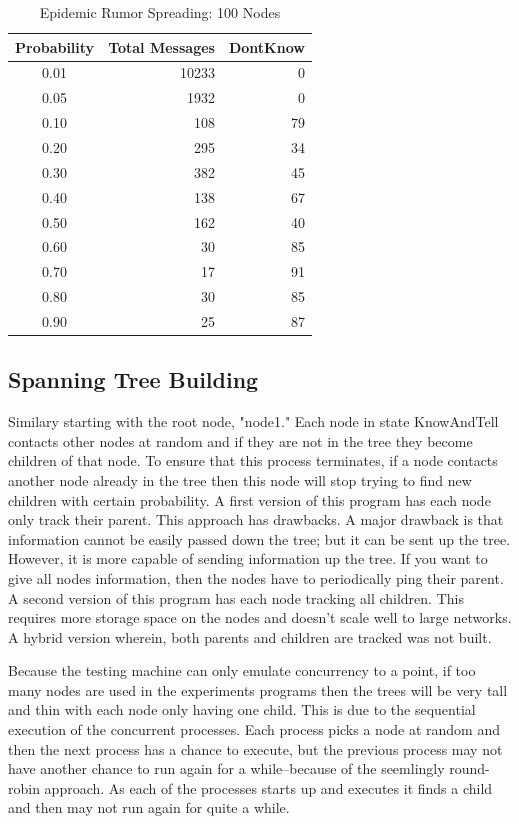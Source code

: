 \documentclass[11pt,twocolumn]{article}
\begin{document}
\begin{table}[h]
\caption{Epidemic Rumor Spreading: 100 Nodes}
\centering
\begin{tabular}{c | r r}
Probability & Total Messages & DontKnow\\
\hline
0.01	& 10233 & 0\\
0.05	& 1932 & 0\\
0.10 & 108 & 79\\
0.20 & 295 & 34\\
0.30 & 382 & 45\\
0.40 & 138 & 67\\
0.50 & 162 & 40\\
0.60 & 30 & 85\\
0.70 & 17 & 91\\
0.80 & 30 & 85\\
0.90 & 25 & 87\\
\hline
\end{tabular}
\label{tab:RumorProbability}
\end{table}

\subsection{Spanning Tree Building}

Similary starting with the root node, "node1."  Each node in state KnowAndTell contacts other nodes at random and if they are not in the tree they become children of that node.  To ensure that this process terminates, if a node contacts another node already in the tree then this node will stop trying to find new children with certain probability.  A first version of this program has each node only track their parent.  This approach has drawbacks.  A major drawback is that information cannot be easily passed down the tree; but it can be sent up the tree.  However, it is more capable of sending information up the tree.  If you want to give all nodes information, then the nodes have to periodically ping their parent.  A second version of this program has each node tracking all children.  This requires more storage space on the nodes and doesn't scale well to large networks.  A hybrid version wherein, both parents and children are tracked was not built.

Because the testing machine can only emulate concurrency to a point, if too many nodes are used in the experiments programs then the trees will be very tall and thin with each node only having one child.  This is due to the sequential execution of the concurrent processes.  Each process picks a node at random and then the next process has a chance to execute, but the previous process may not have another chance to run again for a while--because of the seemlingly round-robin approach.  As each of the processes starts up and executes it finds a child and then may not run again for quite a while.
\end{document}
